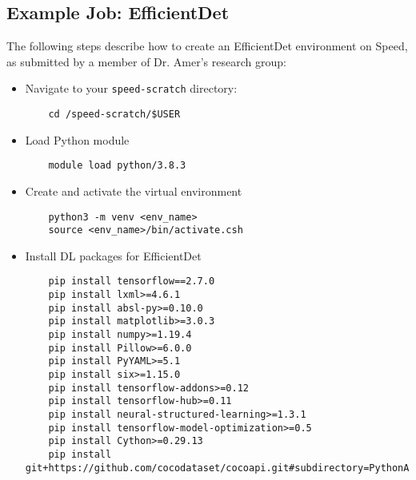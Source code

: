 \subsection{Example Job: EfficientDet}
\label{sect:example-EfficientDet}

The following steps describe how to create an EfficientDet environment on Speed,
as submitted by a member of Dr. Amer's research group:

\begin{itemize}
  \item Navigate to your \texttt{speed-scratch} directory:
  \begin{verbatim}
	cd /speed-scratch/$USER
  \end{verbatim}
  \item Load Python module
  \begin{verbatim}
	module load python/3.8.3
  \end{verbatim}
  \item Create and activate the virtual environment
  \begin{verbatim}
	python3 -m venv <env_name>
	source <env_name>/bin/activate.csh
  \end{verbatim}
  \item Install DL packages for EfficientDet
  \small
  \begin{verbatim}
	pip install tensorflow==2.7.0
	pip install lxml>=4.6.1
	pip install absl-py>=0.10.0
	pip install matplotlib>=3.0.3
	pip install numpy>=1.19.4
	pip install Pillow>=6.0.0
	pip install PyYAML>=5.1
	pip install six>=1.15.0
	pip install tensorflow-addons>=0.12
	pip install tensorflow-hub>=0.11
	pip install neural-structured-learning>=1.3.1
	pip install tensorflow-model-optimization>=0.5
	pip install Cython>=0.29.13
	pip install git+https://github.com/cocodataset/cocoapi.git#subdirectory=PythonAPI
	\end{verbatim}
  \normalsize
\end{itemize}